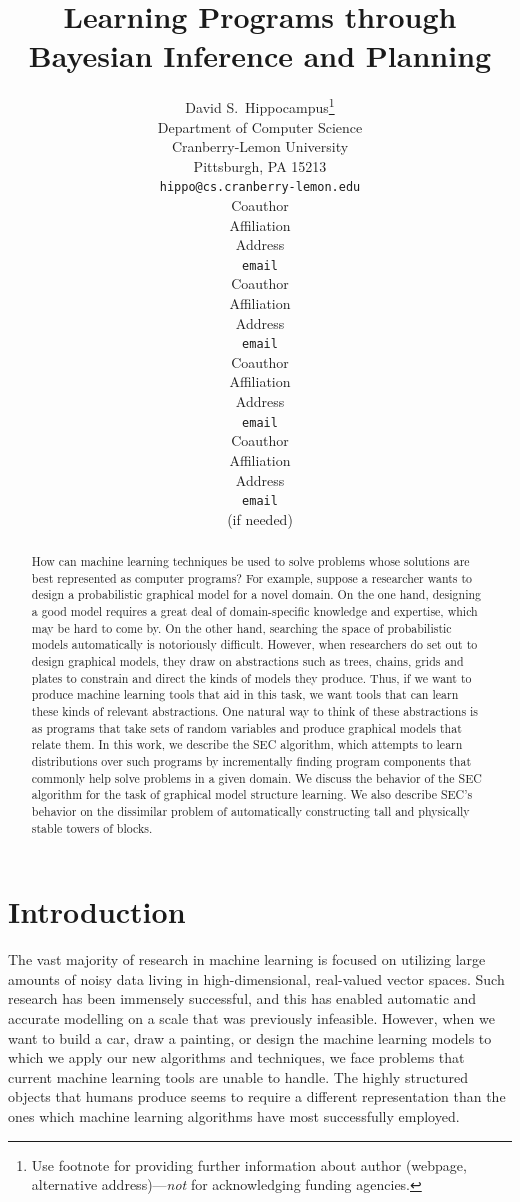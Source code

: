 \documentclass{article} %
\title{Learning Programs through Bayesian Inference and Planning}
\author{
David S.~Hippocampus\thanks{ Use footnote for providing further information
about author (webpage, alternative address)---\emph{not} for acknowledging
funding agencies.} \\
Department of Computer Science\\
Cranberry-Lemon University\\
Pittsburgh, PA 15213 \\
\texttt{hippo@cs.cranberry-lemon.edu} \\
\And
Coauthor \\
Affiliation \\
Address \\
\texttt{email} \\
\AND
Coauthor \\
Affiliation \\
Address \\
\texttt{email} \\
\And
Coauthor \\
Affiliation \\
Address \\
\texttt{email} \\
\And
Coauthor \\
Affiliation \\
Address \\
\texttt{email} \\
(if needed)\\
}
\begin{document}
\maketitle

\begin{abstract}
How can machine learning techniques be used to solve problems whose solutions are best represented as computer programs? For example, suppose a researcher wants to design a probabilistic graphical model for a novel domain. On the one hand, designing a good model requires a great deal of domain-specific knowledge and expertise, which may be hard to come by. On the other hand, searching the space of probabilistic models automatically is notoriously difficult. However, when researchers do set out to design graphical models, they draw on abstractions such as trees, chains, grids and plates to constrain and direct the kinds of models they produce. Thus, if we want to produce machine learning tools that aid in this task, we want tools that can learn these kinds of relevant abstractions. One natural way to think of these abstractions is as programs that take sets of random variables and produce graphical models that relate them. In this work, we describe the SEC algorithm, which attempts to learn distributions over such programs by incrementally finding program components that commonly help solve problems in a given domain. We discuss the behavior of the SEC algorithm for the task of graphical model structure learning. We also describe SEC's behavior on the dissimilar problem of automatically constructing tall and physically stable towers of blocks. 
\end{abstract}

\section{Introduction}

The vast majority of research in machine learning is focused on utilizing large amounts of noisy data living in high-dimensional, real-valued vector spaces. Such research has been immensely successful, and this has enabled automatic and accurate modelling on a scale that was previously infeasible. However, when we want to build a car, draw a painting, or design the machine learning models to which we apply our new algorithms and techniques, we face problems that current machine learning tools are unable to handle. The highly structured objects that humans produce seems to require a different representation than the ones which machine learning algorithms have most successfully employed. 
\end{document}
